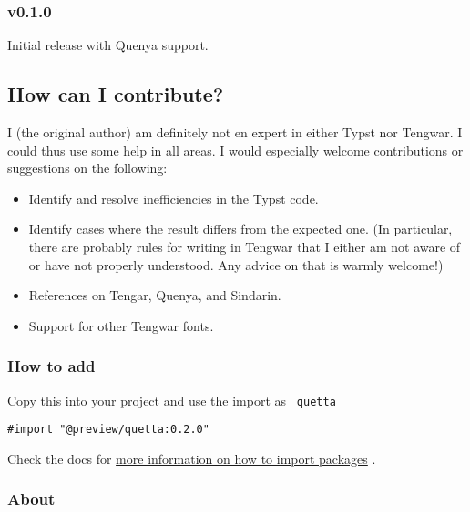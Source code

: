 \subsubsection{v0.1.0}\label{v0.1.0}

Initial release with Quenya support.

\subsection{How can I contribute?}\label{how-can-i-contribute}

I (the original author) am definitely not en expert in either Typst nor
Tengwar. I could thus use some help in all areas. I would especially
welcome contributions or suggestions on the following:

\begin{itemize}
\tightlist
\item
  Identify and resolve inefficiencies in the Typst code.
\item
  Identify cases where the result differs from the expected one. (In
  particular, there are probably rules for writing in Tengwar that I
  either am not aware of or have not properly understood. Any advice on
  that is warmly welcome!)
\item
  References on Tengar, Quenya, and Sindarin.
\item
  Support for other Tengwar fonts.
\end{itemize}

\subsubsection{How to add}\label{how-to-add}

Copy this into your project and use the import as \texttt{\ quetta\ }

\begin{verbatim}
#import "@preview/quetta:0.2.0"
\end{verbatim}



Check the docs for
\href{https://typst.app/docs/reference/scripting/\#packages}{more
information on how to import packages} .

\subsubsection{About}\label{about}

